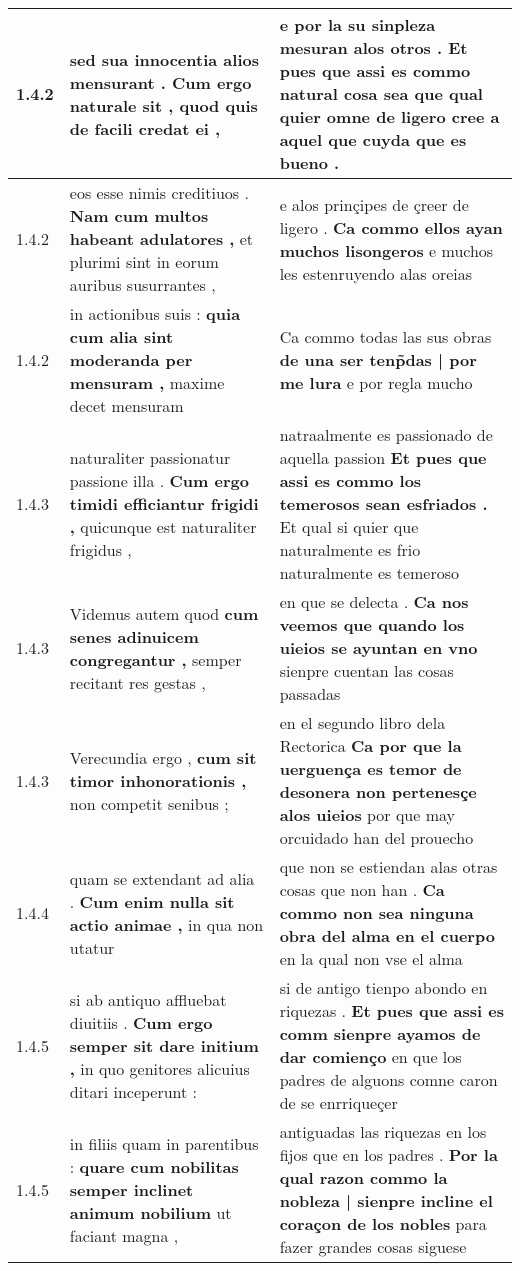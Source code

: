 \begin{tabular}{|p{1cm}|p{6.5cm}|p{6.5cm}|}
1.4.2 & sed sua innocentia alios mensurant . \textbf{ Cum ergo naturale sit , } quod quis de facili credat ei , & e por la su sinpleza mesuran alos otros . \textbf{ Et pues que assi es commo natural cosa sea } que qual quier omne de ligero cree a aquel que cuyda que es bueno . \\\hline
1.4.2 & eos esse nimis creditiuos . \textbf{ Nam cum multos habeant adulatores , } et plurimi sint in eorum auribus susurrantes , & e alos prinçipes de çreer de ligero . \textbf{ Ca commo ellos ayan muchos lisongeros } e muchos les estenruyendo alas oreias \\\hline
1.4.2 & in actionibus suis : \textbf{ quia cum alia sint moderanda per mensuram , } maxime decet mensuram & Ca commo todas las sus obras \textbf{ de una ser tenp̃das | por me lura } e por regla mucho \\\hline
1.4.3 & naturaliter passionatur passione illa . \textbf{ Cum ergo timidi efficiantur frigidi , } quicunque est naturaliter frigidus , & natraalmente es passionado de aquella passion \textbf{ Et pues que assi es commo los temerosos sean esfriados . } Et qual si quier que naturalmente es frio naturalmente es temeroso \\\hline
1.4.3 & Videmus autem quod \textbf{ cum senes adinuicem congregantur , } semper recitant res gestas , & en que se delecta . \textbf{ Ca nos veemos que quando los uieios se ayuntan en vno } sienpre cuentan las cosas passadas \\\hline
1.4.3 & Verecundia ergo , \textbf{ cum sit timor inhonorationis , } non competit senibus ; & en el segundo libro dela Rectorica \textbf{ Ca por que la uerguença es temor de desonera non pertenesçe alos uieios } por que may orcuidado han del prouecho \\\hline
1.4.4 & quam se extendant ad alia . \textbf{ Cum enim nulla sit actio animae , } in qua non utatur & que non se estiendan alas otras cosas que non han . \textbf{ Ca commo non sea ninguna obra del alma en el cuerpo } en la qual non vse el alma \\\hline
1.4.5 & si ab antiquo affluebat diuitiis . \textbf{ Cum ergo semper sit dare initium , } in quo genitores alicuius ditari inceperunt : & si de antigo tienpo abondo en riquezas . \textbf{ Et pues que assi es comm sienpre ayamos de dar comienço } en que los padres de alguons comne caron de se enrriqueçer \\\hline
1.4.5 & in filiis quam in parentibus : \textbf{ quare cum nobilitas semper inclinet animum nobilium } ut faciant magna , & antiguadas las riquezas en los fijos que en los padres . \textbf{ Por la qual razon commo la nobleza | sienpre incline el coraçon de los nobles } para fazer grandes cosas siguese \\\hline

\end{tabular}

